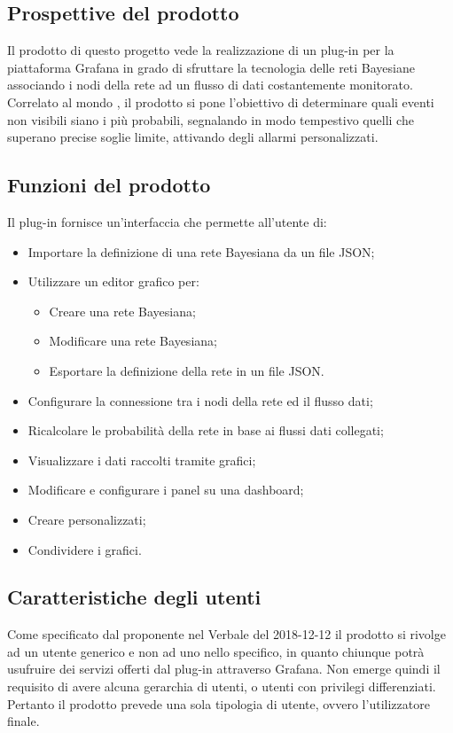 
\subsection{Prospettive del prodotto}
Il prodotto di questo progetto vede la realizzazione di un plug-in per la piattaforma Grafana in grado di sfruttare la tecnologia delle reti Bayesiane associando i nodi della rete ad un flusso di dati costantemente monitorato. Correlato al mondo , il prodotto si pone l'obiettivo di  determinare quali eventi non visibili siano i più probabili, segnalando in modo tempestivo quelli che superano precise soglie limite, attivando degli allarmi personalizzati. 

\subsection{Funzioni del prodotto}
Il plug-in fornisce un'interfaccia che permette all'utente di:

\begin{itemize}
	\item Importare la definizione di una rete Bayesiana da un file JSON;
	\item Utilizzare un editor grafico per:
	\begin{itemize}
		\item Creare una rete Bayesiana;
		\item Modificare una rete Bayesiana;
		\item Esportare la definizione della rete in un file JSON.
	\end{itemize} 
	\item Configurare la connessione tra i nodi della rete ed il flusso dati;
	\item Ricalcolare le probabilità della rete in base ai flussi dati collegati;
	\item Visualizzare i dati raccolti tramite grafici;
	\item Modificare e configurare i panel su una dashboard;
	\item Creare  personalizzati;
	\item Condividere i grafici.
\end{itemize}

\subsection{Caratteristiche degli utenti}
Come specificato dal proponente nel Verbale del 2018-12-12 il prodotto si rivolge ad un utente generico e non ad uno nello specifico, in quanto chiunque potrà usufruire dei servizi offerti dal plug-in attraverso Grafana. Non emerge quindi il requisito di avere alcuna gerarchia di utenti, o utenti con privilegi differenziati. Pertanto il prodotto prevede una sola tipologia di utente, ovvero l’utilizzatore finale.

